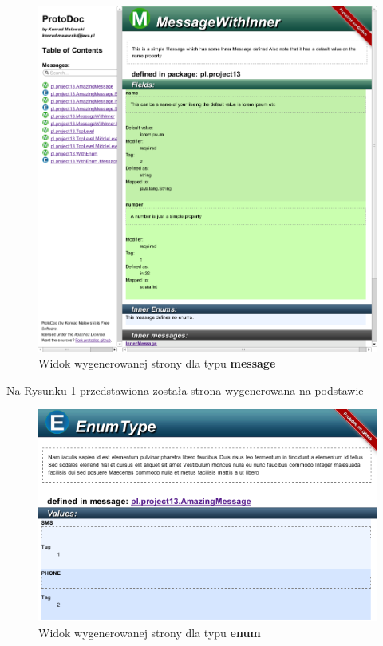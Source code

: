 \documentclass[pdflatex,11pt]{aghdpl}
\begin{document}
\begin{figure}[hc]
 \begin{center}
  \includegraphics[width=\textwidth]{../protodoc_main.png}
 \end{center}
 \caption{Widok wygenerowanej strony dla typu \textbf{message}}
 \label{msg_page}
\end{figure}

Na Rysunku \ref{msg_page} przedstawiona została strona wygenerowana na podstawie 

\begin{figure}[hc]
 \begin{center}
  \includegraphics[width=\textwidth]{../protodoc_enum.png}
 \end{center}
 \caption{Widok wygenerowanej strony dla typu \textbf{enum}}
 \label{enum_page}
\end{figure}
\end{document}
